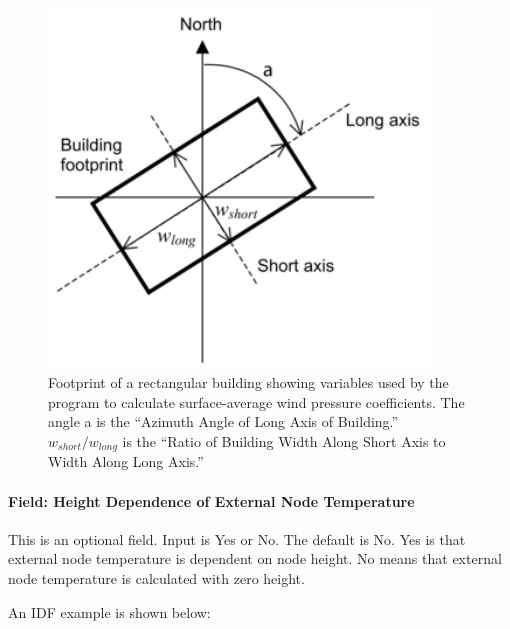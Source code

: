 \begin{figure}[hbtp] %
\centering
\includegraphics[width=0.9\textwidth, height=0.9\textheight, keepaspectratio=true]{media/image221.png}
\caption{Footprint of a rectangular building showing variables used by the program to calculate surface-average wind pressure coefficients. The angle a is the ``Azimuth Angle of Long Axis of Building.''  $w_{short}/w_{long}$ is the ``Ratio of Building Width Along Short Axis to Width Along Long Axis.'' \protect \label{fig:footprint-of-a-rectangular-building-showing}}
\end{figure}

\paragraph{Field: Height Dependence of External Node Temperature}\label{field-height-dependence-of-external-node-temperature}

This is an optional field. Input is Yes or No. The default is No. Yes is that external node temperature is dependent on node height. No means that external node temperature is calculated with zero height.

An IDF example is shown below:


